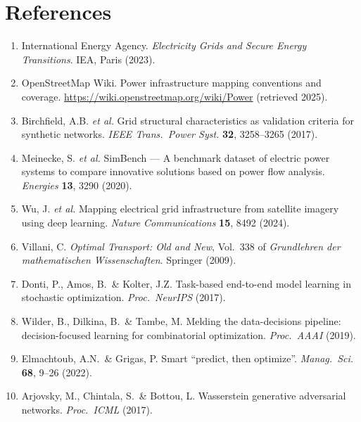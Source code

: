\documentclass[10pt,a4paper]{article}
\begin{document}
\section*{References}

\begin{enumerate}[label={\arabic*.}, leftmargin=*, itemsep=2pt, topsep=2pt]
\item International Energy Agency. \emph{Electricity Grids and
Secure Energy Transitions}. IEA, Paris (2023).

\item OpenStreetMap Wiki. Power infrastructure mapping conventions
and coverage. \url{https://wiki.openstreetmap.org/wiki/Power}
(retrieved 2025).

\item Birchfield, A.B. \emph{et al.} Grid structural
characteristics as validation criteria for synthetic networks.
\emph{IEEE Trans.\ Power Syst.} \textbf{32}, 3258--3265 (2017).

\item Meinecke, S. \emph{et al.} SimBench --- A benchmark dataset
of electric power systems to compare innovative solutions based
on power flow analysis. \emph{Energies} \textbf{13}, 3290 (2020).

\item Wu, J. \emph{et al.} Mapping electrical grid infrastructure
from satellite imagery using deep learning. \emph{Nature
Communications} \textbf{15}, 8492 (2024).

\item Villani, C. \emph{Optimal Transport: Old and New}, Vol.\ 338
of \emph{Grundlehren der mathematischen Wissenschaften}. Springer
(2009).

\item Donti, P., Amos, B.\ \& Kolter, J.Z. Task-based end-to-end
model learning in stochastic optimization. \emph{Proc.\ NeurIPS}
(2017).

\item Wilder, B., Dilkina, B.\ \& Tambe, M. Melding the
data-decisions pipeline: decision-focused learning for
combinatorial optimization. \emph{Proc.\ AAAI} (2019).

\item Elmachtoub, A.N.\ \& Grigas, P. Smart ``predict, then
optimize''. \emph{Manag.\ Sci.} \textbf{68}, 9--26 (2022).

\item Arjovsky, M., Chintala, S.\ \& Bottou, L. Wasserstein
generative adversarial networks. \emph{Proc.\ ICML} (2017).


\end{enumerate}
\end{document}
